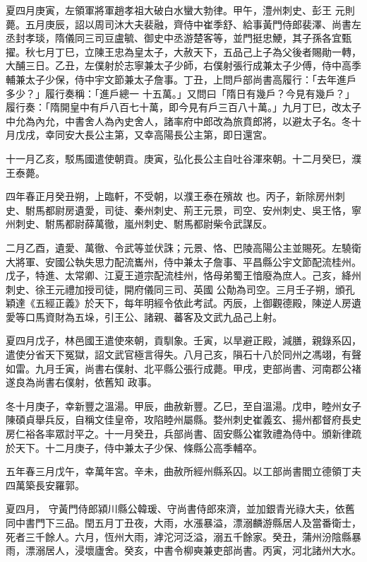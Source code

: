 \begin{pinyinscope}
 夏四月庚寅，左領軍將軍趙孝祖大破白水蠻大勃律。甲午，澧州刺史、彭王
 元則薨。五月庚辰，詔以周司沐大夫裴融，齊侍中崔季舒、給事黃門侍郎裴澤、尚書左丞封孝琰，隋儀同三司豆盧毓、御史中丞游楚客等，並門挺忠鯁，其子孫各宜甄擢。秋七月丁巳，立陳王忠為皇太子，大赦天下，五品己上子為父後者賜勛一轉，大酺三日。乙丑，左僕射於志寧兼太子少師，右僕射張行成兼太子少傅，侍中高季輔兼太子少保，侍中宇文節兼太子詹事。丁丑，上問戶部尚書高履行：「去年進戶多少？」履行奏稱：「進戶總一
 十五萬。」又問曰「隋日有幾戶？今見有幾戶？」履行奏：「隋開皇中有戶八百七十萬，即今見有戶三百八十萬。」九月丁巳，改太子中允為內允，中書舍人為內史舍人，諸率府中郎改為旅賁郎將，以避太子名。冬十月戊戌，幸同安大長公主第，又幸高陽長公主第，即日還宮。



 十一月乙亥，駁馬國遣使朝貢。庚寅，弘化長公主自吐谷渾來朝。十二月癸巳，濮王泰薨。



 四年春正月癸丑朔，上臨軒，不受朝，以濮王泰在殯故
 也。丙子，新除房州刺史、駙馬都尉房遺愛，司徒、秦州刺史、荊王元景，司空、安州刺史、吳王恪，寧州刺史、駙馬都尉薛萬徹，嵐州刺史、駙馬都尉柴令武謀反。



 二月乙酉，遺愛、萬徹、令武等並伏誅；元景、恪、巴陵高陽公主並賜死。左驍衛大將軍、安國公執失思力配流巂州，侍中兼太子詹事、平昌縣公宇文節配流桂州。戊子，特進、太常卿、江夏王道宗配流桂州，恪母弟蜀王愔廢為庶人。己亥，絳州刺史、徐王元禮加授司徒，開府儀同三司、英國
 公勣為司空。三月壬子朔，頒孔穎達《五經正義》於天下，每年明經令依此考試。丙辰，上御觀德殿，陳逆人房遺愛等口馬資財為五垛，引王公、諸親、蕃客及文武九品己上射。



 夏四月戊子，林邑國王遣使來朝，貢馴象。壬寅，以旱避正殿，減膳，親錄系囚，遣使分省天下冤獄，詔文武官極言得失。八月己亥，隕石十八於同州之馮翊，有聲如雷。九月壬寅，尚書右僕射、北平縣公張行成薨。甲戌，吏部尚書、河南郡公褚遂良為尚書右僕射，依舊知
 政事。



 冬十月庚子，幸新豐之溫湯。甲辰，曲赦新豐。乙巳，至自溫湯。戊申，睦州女子陳碩貞舉兵反，自稱文佳皇帝，攻陷睦州屬縣。婺州刺史崔義玄、揚州都督府長史房仁裕各率眾討平之。十一月癸丑，兵部尚書、固安縣公崔敦禮為侍中。頒新律疏於天下。十二月庚子，侍中兼太子少保、條縣公高季輔卒。



 五年春三月戊午，幸萬年宮。辛未，曲赦所經州縣系囚。以工部尚書閻立德領丁夫四萬築長安羅郭。



 夏四月，
 守黃門侍郎潁川縣公韓瑗、守尚書侍郎來濟，並加銀青光祿大夫，依舊同中書門下三品。閏五月丁丑夜，大雨，水漲暴溢，漂溺麟游縣居人及當番衛士，死者三千餘人。六月，恆州大雨，滹沱河泛溢，溺五千餘家。癸丑，蒲州汾陰縣暴雨，漂溺居人，浸壞廬舍。癸亥，中書令柳奭兼吏部尚書。丙寅，河北諸州大水。




\end{pinyinscope}
